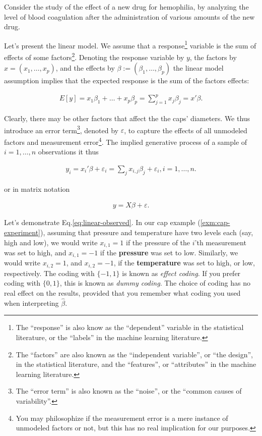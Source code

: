 \documentclass[]{book}
\theoremstyle{definition}
\theoremstyle{definition}
\theoremstyle{definition}
\theoremstyle{remark}
\let\BeginKnitrBlock\begin \let\EndKnitrBlock\end
\begin{document}
\BeginKnitrBlock{example}[Drug Effect]
\protect\hypertarget{exm:unnamed-chunk-98}{}{\label{exm:unnamed-chunk-98}
{} }Consider the study of the effect of a new
drug for hemophilia, by analyzing the level of blood coagulation after
the administration of various amounts of the new drug.
\EndKnitrBlock{example}

Let's present the linear model. We assume that a response\footnote{The
  ``response'' is also know as the ``dependent'' variable in the
  statistical literature, or the ``labels'' in the machine learning
  literature.} variable is the sum of effects of some factors\footnote{The
  ``factors'' are also known as the ``independent variable'', or ``the
  design'', in the statistical literature, and the ``features'', or
  ``attributes'' in the machine learning literature.}. Denoting the
response variable by \(y\), the factors by \(x=(x_1,\dots,x_p)\), and
the effects by \(\beta:=(\beta_1,\dots,\beta_p)\) the linear model
assumption implies that the expected response is the sum of the factors
effects:

\begin{align}
  E[y]=x_1 \beta_1 + \dots + x_p \beta_p = \sum_{j=1}^p x_j \beta_j = x'\beta .
  \label{eq:linear-mean}
\end{align}

Clearly, there may be other factors that affect the the caps' diameters.
We thus introduce an error term\footnote{The ``error term'' is also
  known as the ``noise'', or the ``common causes of variability''.},
denoted by \(\varepsilon\), to capture the effects of all unmodeled
factors and measurement error\footnote{You may philosophize if the
  measurement error is a mere instance of unmodeled factors or not, but
  this has no real implication for our purposes.}. The implied
generative process of a sample of \(i=1,\dots,n\) observations it thus

\begin{align}
  y_i = x_i'\beta + \varepsilon_i = \sum_j x_{i,j} \beta_j + \varepsilon_i , i=1,\dots,n .
  \label{eq:linear-observed}
\end{align}

or in matrix notation

\begin{align}
  y = X \beta + \varepsilon .
  \label{eq:linear-matrix}
\end{align}

Let's demonstrate Eq.\eqref{eq:linear-observed}. In our cap example
(\ref{exm:cap-experiment}), assuming that pressure and temperature have
two levels each (say, high and low), we would write \(x_{i,1}=1\) if the
pressure of the \(i\)'th measurement was set to high, and \(x_{i,1}=-1\)
if the \textbf{pressure} was set to low. Similarly, we would write
\(x_{i,2}=1\), and \(x_{i,2}=-1\), if the \textbf{temperature} was set
to high, or low, respectively. The coding with \(\{-1,1\}\) is known as
\emph{effect coding}. If you prefer coding with \(\{0,1\}\), this is
known as \emph{dummy coding}. The choice of coding has no real effect on
the results, provided that you remember what coding you used when
interpreting \(\hat \beta\).
\end{document}
